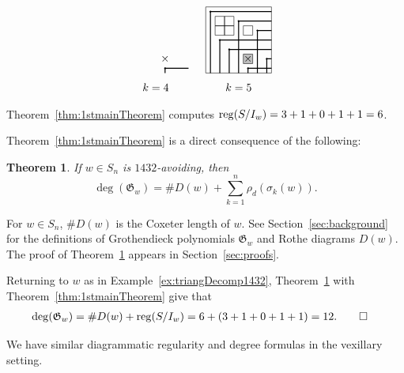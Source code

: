 \documentclass[12pt]{amsart}
\newtheorem{theorem}{Theorem}[section]
\theoremstyle{definition}
\newenvironment{example}
  {\pushQED{\qed}\renewcommand{\qedsymbol}{$\diamondsuit$}\examplex}
  {\popQED\endexamplex}
\theoremstyle{remark}
\numberwithin{equation}{section}
\newcommand{\Sym}{S}
\newcommand{\reg}{{\rm reg}}
\newcommand{\maxsizediag}{\rho_d}
\begin{document}
\begin{example}
\[\begin{tikzpicture}[scale=.3]
	\filldraw (4.5,0.5) circle (.5ex);
	\draw[line width = .2ex] (4.5,0) -- (4.5,0.5) -- (7,0.5);
	\node[] at (3.5,-1.5){$k=4$};
	\node[] at (4.5,1.5){$\times$};
\end{tikzpicture}
\hspace{1.5em}
\begin{tikzpicture}[scale=.3]
	\draw (0,0) rectangle (7,7);
	\draw (1,5) rectangle (2,6);
	\draw (1,4) rectangle (2,5);
	\draw (2,5) rectangle (3,6);
	\draw (2,4) rectangle (3,5);
	\draw[] (4,4) rectangle (5,5);
	\draw[fill=gray!50] (4,1) rectangle (5,2);
	\filldraw (0.5,6.5) circle (.5ex);
	\draw[line width = .2ex] (0.5,0) -- (0.5,6.5) -- (7,6.5);
	\filldraw (3.5,5.5) circle (.5ex);
	\draw[line width = .2ex] (3.5,0) -- (3.5,5.5) -- (7,5.5);
	\filldraw (5.5,4.5) circle (.5ex);
	\draw[line width = .2ex] (5.5,0) -- (5.5,4.5) -- (7,4.5);
	\filldraw (1.5,3.5) circle (.5ex);
	\draw[line width = .2ex] (1.5,0) -- (1.5,3.5) -- (7,3.5);
	\filldraw (2.5,2.5) circle (.5ex);
	\draw[line width = .2ex] (2.5,0) -- (2.5,2.5) -- (7,2.5);
	\filldraw (6.5,1.5) circle (.5ex);
	\draw[line width = .2ex] (6.5,0) -- (6.5,1.5) -- (7,1.5);
	\filldraw (4.5,0.5) circle (.5ex);
	\draw[line width = .2ex] (4.5,0) -- (4.5,0.5) -- (7,0.5);
	\node[] at (3.5,-1.5){$k=5$};
	\node[] at (4.5,1.5){$\times$};
\end{tikzpicture}\]
Theorem~\ref{thm:1stmainTheorem} computes $\reg( S/I_w)=3+1+0+1+1=6$.
\end{example}

Theorem~\ref{thm:1stmainTheorem} is a direct consequence of the following:
\begin{theorem}\label{thm:1432}
	If $w\in \Sym_n$ is $1432$-avoiding, then
	\[\deg(\mathfrak G_w)=\#D(w) + \sum_{k=1}^n \maxsizediag(\sigma_k(w)).\]
\end{theorem} 
For $w\in S_n$, $\#D(w)$ is the Coxeter length of $w$. See Section~\ref{sec:background} for the definitions of Grothendieck polynomials $\mathfrak G_w$ and Rothe diagrams $D(w)$.
The proof of Theorem~\ref{thm:1432} appears in Section~\ref{sec:proofs}.

\begin{example}
Returning to $w$ as in Example~\ref{ex:triangDecomp1432},
Theorem~\ref{thm:1432} with Theorem~\ref{thm:1stmainTheorem} give that 
\begin{align*}
\deg(\mathfrak G_w)&= \#D(w) + \reg( S/I_w)= 6 + (3+1+0+1+1)=12.\qedhere\end{align*}
\end{example}

We have similar diagrammatic regularity and degree formulas in the vexillary setting.
\end{document}

